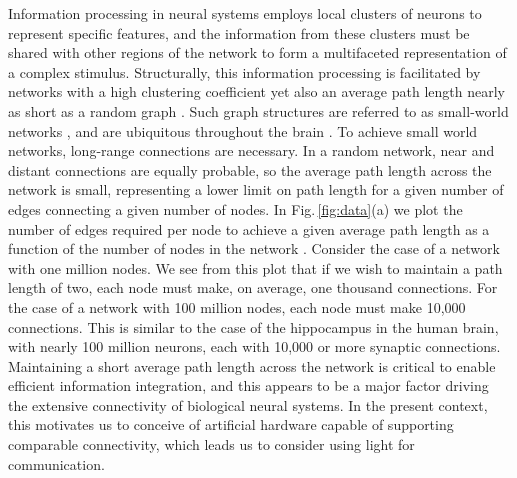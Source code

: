 \documentclass[twocolumn]{article}
\begin{document}
Information processing in neural systems employs local clusters of neurons to represent specific features, and the information from these clusters must be shared with other regions of the network to form a multifaceted representation of a complex stimulus. Structurally, this information processing is facilitated by networks with a high clustering coefficient yet also an average path length nearly as short as a random graph \cite{eskn2015}. Such graph structures are referred to as small-world networks \cite{wast1998}, and are ubiquitous throughout the brain \cite{sp2010}. To achieve small world networks, long-range connections are necessary. In a random network, near and distant connections are equally probable, so the average path length across the network is small, representing a lower limit on path length for a given number of edges connecting a given number of nodes. In Fig.\,\ref{fig:data}(a) we plot the number of edges required per node to achieve a given average path length as a function of the number of nodes in the network \cite{frfr2004}. Consider the case of a network with one million nodes. We see from this plot that if we wish to maintain a path length of two, each node must make, on average, one thousand connections. For the case of a network with 100 million nodes, each node must make 10,000 connections. This is similar to the case of the hippocampus in the human brain, with nearly 100 million neurons, each with 10,000 or more synaptic connections. Maintaining a short average path length across the network is critical to enable efficient information integration, and this appears to be a major factor driving the extensive connectivity of biological neural systems. In the present context, this motivates us to conceive of artificial hardware capable of supporting comparable connectivity, which leads us to consider using light for communication.
\end{document}
